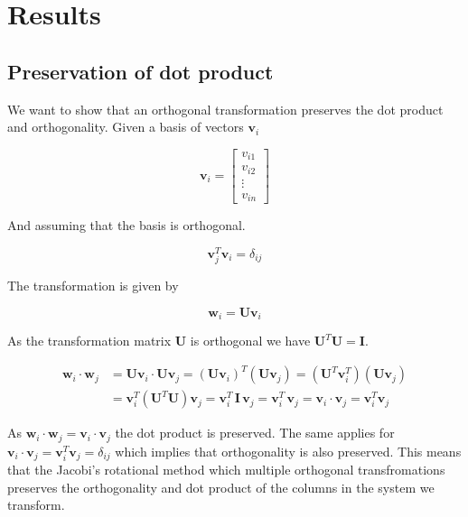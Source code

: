 \documentclass[a4paper, fontsize=11pt]{article}
\begin{document}
\section{Results}
\subsection{Preservation of dot product}
We want to show that an orthogonal transformation preserves the dot product and orthogonality. Given a basis of vectors $\textbf{v}_{i}$

\begin{equation}
\textbf{v}_{i}=
\begin{bmatrix}
v_{i1} \\
v_{i2} \\
\vdots \\
v_{in}
\end{bmatrix}
\end{equation}

And assuming that the basis is orthogonal.

\begin{equation}
\textbf{v}^{T}_{j} \textbf{v}_{i} = \delta_{ij}
\end{equation}

The transformation is given by

\begin{equation}
\textbf{w}_{i} = \textbf{U} \textbf{v}_{i}
\end{equation}

As the transformation matrix \textbf{U} is orthogonal we have $\textbf{U}^{T}\textbf{U} = \textbf{I}$.

\begin{align*}
\textbf{w}_{i} \cdot \textbf{w}_{j} & =\textbf{U} \textbf{v}_{i} \cdot \textbf{U} \textbf{v}_{j} = (\textbf{U}\textbf{v}_{i})^{T}(\textbf{U}\textbf{v}_{j})=(\textbf{U}^{T} \textbf{v}_{i}^{T})(\textbf{U}\textbf{v}_{j})\\
&= \textbf{v}_{i}^{T} (\textbf{U}^{T} \textbf{U}) \textbf{v}_{j}= \textbf{v}_{i}^{T} \, \textbf{I} \, \textbf{v}_{j} =  \textbf{v}_{i}^{T} \,  \textbf{v}_{j} = \textbf{v}_{i} \cdot \textbf{v}_{j} = \textbf{v}^T_{i} \textbf{v}_{j}
\end{align*}

As $\textbf{w}_{i} \cdot \textbf{w}_{j} = \textbf{v}_{i} \cdot \textbf{v}_{j}$ the dot product is preserved. The same applies for $\textbf{v}_{i} \cdot \textbf{v}_{j} = \textbf{v}^T_{i} \textbf{v}_{j} = \delta_{ij}$ which implies that orthogonality is also preserved. This means that the Jacobi's rotational method which multiple orthogonal transfromations preserves the orthogonality and dot product of the columns in the system we transform.
\end{document}
